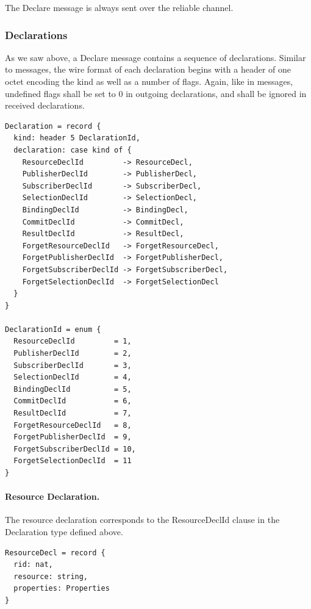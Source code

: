 \documentclass[a4paper,oneside,article]{memoir}
\begin{document}
The Declare message is always sent over the reliable channel.

\subsubsection{Declarations}

As we saw above, a Declare message contains a sequence of declarations.  Similar to messages, the
wire format of each declaration begins with a header of one octet encoding the kind as well as a
number of flags.  Again, like in messages, undefined flags shall be set to 0 in outgoing
declarations, and shall be ignored in received declarations.

\begin{verbatim}
Declaration = record {
  kind: header 5 DeclarationId,
  declaration: case kind of {
    ResourceDeclId         -> ResourceDecl,
    PublisherDeclId        -> PublisherDecl,
    SubscriberDeclId       -> SubscriberDecl,
    SelectionDeclId        -> SelectionDecl,
    BindingDeclId          -> BindingDecl,
    CommitDeclId           -> CommitDecl,
    ResultDeclId           -> ResultDecl,
    ForgetResourceDeclId   -> ForgetResourceDecl,
    ForgetPublisherDeclId  -> ForgetPublisherDecl,
    ForgetSubscriberDeclId -> ForgetSubscriberDecl,
    ForgetSelectionDeclId  -> ForgetSelectionDecl
  }
}

DeclarationId = enum {
  ResourceDeclId         = 1,
  PublisherDeclId        = 2,
  SubscriberDeclId       = 3,
  SelectionDeclId        = 4,
  BindingDeclId          = 5,
  CommitDeclId           = 6,
  ResultDeclId           = 7,
  ForgetResourceDeclId   = 8,
  ForgetPublisherDeclId  = 9,
  ForgetSubscriberDeclId = 10,
  ForgetSelectionDeclId  = 11
}  
\end{verbatim}

\paragraph{Resource Declaration.} The resource declaration corresponds to the ResourceDeclId clause
in the Declaration type defined above.
\begin{verbatim}
ResourceDecl = record {
  rid: nat,
  resource: string,
  properties: Properties
}  
\end{verbatim}
\end{document}

